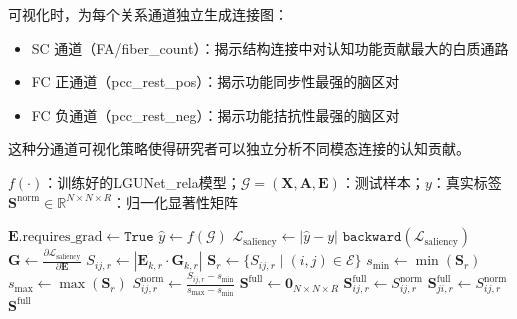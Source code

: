 可视化时，为每个关系通道独立生成连接图：
\begin{itemize}
    \item SC 通道（FA/fiber\_count）：揭示结构连接中对认知功能贡献最大的白质通路
    \item FC 正通道（pcc\_rest\_pos）：揭示功能同步性最强的脑区对
    \item FC 负通道（pcc\_rest\_neg）：揭示功能拮抗性最强的脑区对
\end{itemize}

这种分通道可视化策略使得研究者可以独立分析不同模态连接的认知贡献。

\begin{algorithm}
  \centering
  \caption{Input $\times$ Gradient 显著性图计算流程}
  \label{alg:saliency_computation}
  \small
  \begin{algorithmic}[1]
  \REQUIRE $f(\cdot)$：训练好的LGUNet\_rela模型；$\mathcal{G} = (\mathbf{X}, \mathbf{A}, \mathbf{E})$：测试样本；$y$：真实标签
  \ENSURE $\mathbf{S}^{\text{norm}} \in \mathbb{R}^{N \times N \times R}$：归一化显著性矩阵

  \STATE {}
  \STATE $\mathbf{E}.\text{requires\_grad} \leftarrow \texttt{True}$
  \STATE {}
  \STATE $\hat{y} \leftarrow f(\mathcal{G})$
  \STATE {}
  \STATE $\mathcal{L}_{\text{saliency}} \leftarrow |\hat{y} - y|$
  \STATE $\texttt{backward}(\mathcal{L}_{\text{saliency}})$
  \STATE {}
  \STATE $\mathbf{G} \leftarrow \frac{\partial \mathcal{L}_{\text{saliency}}}{\partial \mathbf{E}}$
  \STATE {}
      \STATE $S_{ij,r} \leftarrow |\mathbf{E}_{k,r} \cdot \mathbf{G}_{k,r}|$
    \ENDFOR
  \ENDFOR
  \STATE {}
    \STATE $\mathbf{S}_r \leftarrow \{ S_{ij,r} \mid (i,j) \in \mathcal{E} \}$
    \STATE $s_{\min} \leftarrow \min(\mathbf{S}_r)$
    \STATE $s_{\max} \leftarrow \max(\mathbf{S}_r)$
    \STATE $S_{ij,r}^{\text{norm}} \leftarrow \frac{S_{ij,r} - s_{\min}}{s_{\max} - s_{\min}}$
  \ENDFOR
  \STATE {}
  \STATE $\mathbf{S}^{\text{full}} \leftarrow \mathbf{0}_{N \times N \times R}$
      \STATE $\mathbf{S}^{\text{full}}_{ij,r} \leftarrow S_{ij,r}^{\text{norm}}$
      \STATE $\mathbf{S}^{\text{full}}_{ji,r} \leftarrow S_{ij,r}^{\text{norm}}$
    \ENDFOR
  \ENDFOR
  \RETURN $\mathbf{S}^{\text{full}}$
  \end{algorithmic}
\end{algorithm}

